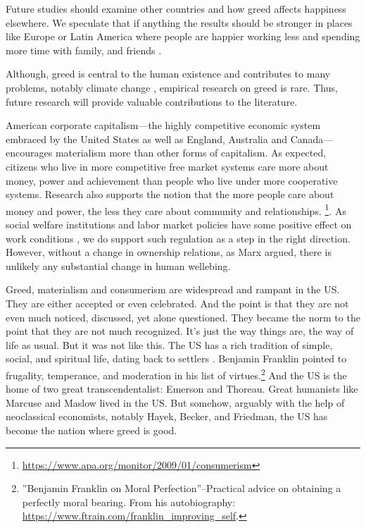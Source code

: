\documentclass[10pt, letterpaper]{article}
\begin{document}
\begin{spacing}{1.8}
Future studies should examine other countries and how greed affects happiness elsewhere. We speculate that if anything the results should be stronger in places like Europe or Latin America where people are happier working less and spending more time with family, and friends \citep{valente16,valente15,aokditella}.  

Although, greed is central to the human existence and contributes to many problems, notably climate change \citep[e.g.,][]{okulicz19}, empirical research on greed is rare. Thus, future research will provide valuable contributions to the literature. 


American corporate capitalism---the highly competitive economic system embraced by the United States as well as England, Australia and Canada---encourages
materialism more than other forms of capitalism.
%
As expected, citizens who live in more competitive free market systems care more about money, power and achievement than people who live under more cooperative systems. Research also supports the notion that the more people care about money and power, the less they care about community and relationships.
\footnote{\url{https://www.apa.org/monitor/2009/01/consumerism}}.
 As social welfare institutions and labor market policies have some positive
 effect on work conditions \citep{inanc20}, we do support such regulation as a step in the
 right direction. However, without a change in ownership relations,
 as Marx argued, there is unlikely any substantial change in human wellebing. %


Greed, materialism and consumerism are widespread and rampant in the US. They
are either accepted or even celebrated. And the point is that they are not even
much noticed, discussed, yet alone questioned. They became the norm to the point
that they are not much recognized. It's just the way things are, the way of life
as usual. But it was not like this. The  US has a rich tradition of simple,
social, and spiritual life, dating back to settlers \cite{fischer91}. Benjamin
Franklin pointed to frugality, temperance, and moderation in his list of
virtues.\footnote{''Benjamin Franklin on Moral Perfection''--Practical advice on
  obtaining a perfectly moral bearing. From his autobiography:
  \url{https://www.ftrain.com/franklin_improving_self}.} And the
US is the home of two great transcendentalist: Emerson and Thoreau. Great humanists like Marcuse and Maslow lived in the
US. But somehow, arguably with the help of neoclassical economists, notably
Hayek, Becker, and Friedman, the US has become the nation where greed is good.


\end{spacing}
\end{document}
